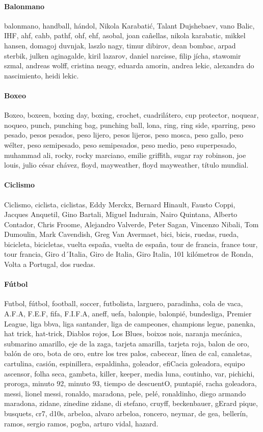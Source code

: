 \documentclass[../all.tex]{subfiles}
\begin{document}
    \paragraph{Balonmano}
    balonmano, handball, hándol, Nikola Karabatić, Talant Dujshebaev, vano Balic, IHF, ahf, cahb, pathf, ohf, ehf, asobal, joan cañellas, nikola karabatic, mikkel hansen, domagoj duvnjak, laszlo nagy, timur dibirov, dean bombac, arpad sterbik, julken aginagalde, kiril lazarov, daniel narcisse, filip jícha, stawomir szmal, andreas wolff, cristina neagy, eduarda amorin, andrea lekic, alexandra do nascimiento, heidi lekic.
    \paragraph{Boxeo}
    Boxeo, boxeen, boxing day, boxing,  crochet, cuadrilátero, cup protector, noquear, noqueo, punch, punching bag, punching ball, lona, ring, ring side, sparring, peso pesado, pesos pesados, peso lijero, pesos lijeros, peso mosca, peso gallo, peso wélter, peso semipesado, peso semipesados, peso medio, peso superpesado, muhammad ali, rocky, rocky marciano, emilie griffith, sugar ray robinson, joe louis, julio césar chávez, floyd, mayweather, floyd mayweather, título mundial.
    \paragraph{Ciclismo}
    Ciclismo, ciclista, ciclistas, Eddy Merckx, Bernard Hinault, Fausto Coppi, Jacques Anquetil, Gino Bartali, Miguel Indurain, Nairo Quintana, Alberto Contador, Chris Froome, Alejandro Valverde, Peter Sagan, Vincenzo Nibali, Tom Dumoulin, Mark Cavendish, Greg Van Avermaet, bici, bicis, ruedas, rueda, bicicleta, bicicletas, vuelta españa, vuelta de españa, tour de francia, france tour, tour francia, Giro d´Italia, Giro de Italia, Giro Italia, 101 kilómetros de Ronda, Volta a Portugal, dos ruedas.
    \paragraph{Fútbol}
    Futbol, fútbol, football, soccer, futbolista, larguero, paradinha, cola de vaca, A.F.A, F.E.F, fifa, F.I.F.A, aneff, uefa, balonpie, balonpié, bundesliga, Premier League, liga bbva, liga santander, liga de campeones, champions legue, panenka, hat trick, hat-trick, Diablos rojos, Los Blues, boixos nois, naranja mecánica, submarino amarillo, eje de la zaga, tarjeta amarilla, tarjeta roja, balon de oro, balón de oro, bota de oro, entre los tres palos, cabecear, línea de cal, canaletas, cartulina, casión, espinillera, espaldinha, goleador, efiCacia goleadora, equipo ascensor, folha seca, gambeta, killer, keeper, media luna, coutinho, var, pichichi, proroga, minuto 92, minuto 93, tiempo de descuentO, puntapié, racha goleadora, messi, lionel messi, ronaldo, maradona, pele, pelé, ronaldinho, diego armando maradona, zidane, zinedine zidane, di stefano, cruyff, beckenbauer, gErard pique, busquets, cr7, d10s, arbeloa, alvaro arbeloa, roncero, neymar, de gea, bellerín, ramos, sergio ramos, pogba, arturo vidal, hazard.
\end{document}
